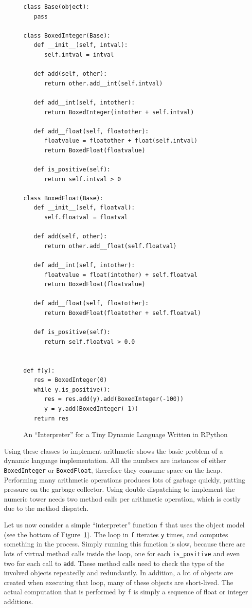 \documentclass{sigplanconf}
\begin{document}
\begin{figure}
\begin{lstlisting}[mathescape,basicstyle=\setstretch{1.1}\ttfamily\scriptsize]
class Base(object):
   pass

class BoxedInteger(Base):
   def __init__(self, intval):
      self.intval = intval

   def add(self, other):
      return other.add__int(self.intval)

   def add__int(self, intother):
      return BoxedInteger(intother + self.intval)

   def add__float(self, floatother):
      floatvalue = floatother + float(self.intval)
      return BoxedFloat(floatvalue)

   def is_positive(self):
      return self.intval > 0

class BoxedFloat(Base):
   def __init__(self, floatval):
      self.floatval = floatval

   def add(self, other):
      return other.add__float(self.floatval)

   def add__int(self, intother):
      floatvalue = float(intother) + self.floatval
      return BoxedFloat(floatvalue)

   def add__float(self, floatother):
      return BoxedFloat(floatother + self.floatval)

   def is_positive(self):
      return self.floatval > 0.0


def f(y):
   res = BoxedInteger(0)
   while y.is_positive():
      res = res.add(y).add(BoxedInteger(-100))
      y = y.add(BoxedInteger(-1))
   return res
\end{lstlisting}
\caption{An ``Interpreter'' for a Tiny Dynamic Language Written in RPython}
\label{fig:objmodel}
\end{figure}

Using these classes to implement arithmetic shows the basic problem of a
dynamic language implementation. All the numbers are instances of either
\lstinline{BoxedInteger} or \lstinline{BoxedFloat}, therefore they consume space on the
heap. Performing many arithmetic operations produces lots of garbage quickly,
putting pressure on the garbage collector. Using double dispatching to
implement the numeric tower needs two method calls per arithmetic operation,
which is costly due to the method dispatch.

Let us now consider a simple ``interpreter'' function \lstinline{f} that uses the
object model (see the bottom of Figure~\ref{fig:objmodel}).
The loop in \lstinline{f} iterates \lstinline{y} times, and computes something in the process.
Simply running this function is slow, because there are lots of virtual method
calls inside the loop, one for each \lstinline{is_positive} and even two for each
call to \lstinline{add}. These method calls need to check the type of the involved
objects repeatedly and redundantly. In addition, a lot of objects are created
when executing that loop, many of these objects are short-lived.
The actual computation that is performed by \lstinline{f} is simply a sequence of
float or integer additions.
\end{document}
